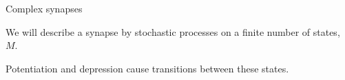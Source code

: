 \documentclass[final,hyperref={pdfpagelabels=false,bookmarks=false}]{beamer}
\begin{document}
\begin{frame}{}
\begin{columns}[t]
\begin{column}{0.33\linewidth}
\begin{block}{Complex synapses}
\begin{minipage}[t]{0.53\linewidth}
   \vp We will describe a synapse by stochastic processes on a finite number of states, $M$.

   \vp Potentiation and depression cause transitions between these states.

   \vp
   \begin{center}
   \end{center}
 \end{minipage}
 \begin{minipage}[t]{0.45\linewidth}
   \begin{center}
   \end{center}


\end{minipage}
\end{block}
\end{column}
\end{columns}
\end{frame}
\end{document}
